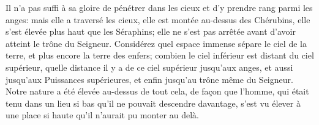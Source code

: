 Il n’a pas suffi à sa gloire de pénétrer dans les cieux
	et d’y prendre rang parmi les anges:
	mais elle a traversé les cieux, elle est montée au-dessus des Chérubins,
	elle s’est élevée plus haut que les Séraphins;
	elle ne s’est pas arrêtée avant d’avoir atteint le trône du Seigneur.
Considérez quel espace immense sépare le ciel de la terre,
	et plus encore la terre des enfers;
	combien le ciel inférieur est distant du ciel supérieur,
	quelle distance il y a de ce ciel supérieur jusqu’aux anges,
	et aussi jusqu’aux Puissances supérieures,
	et enfin jusqu’au trône même du Seigneur.
Notre nature a été élevée au-dessus de tout cela,
	de façon que l’homme,
	qui était tenu dans un lieu si bas qu’il ne pouvait descendre davantage,
	s’est vu élever à une place si haute qu’il n’aurait pu monter au delà.
